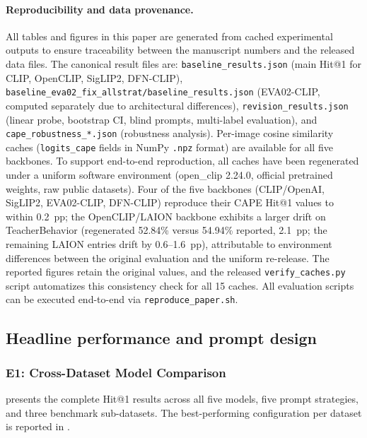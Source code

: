 \documentclass[symmetry,article,submit,pdftex,moreauthors]{Definitions/mdpi}
\begin{document}
\paragraph{Reproducibility and data provenance.}
All tables and figures in this paper are generated from cached experimental outputs to ensure traceability between the manuscript numbers and the released data files. The canonical result files are: \texttt{baseline\_results.json} (main Hit@1 for CLIP, OpenCLIP, SigLIP2, DFN-CLIP), \texttt{baseline\_eva02\_fix\_allstrat/baseline\_results.json} (EVA02-CLIP, computed separately due to architectural differences), \texttt{revision\_results.json} (linear probe, bootstrap CI, blind prompts, multi-label evaluation), and \texttt{cape\_robustness\_*.json} (robustness analysis). Per-image cosine similarity caches (\texttt{logits\_cape} fields in NumPy \texttt{.npz} format) are available for all five backbones. To support end-to-end reproduction, all caches have been regenerated under a uniform software environment (open\_clip 2.24.0, official pretrained weights, raw public datasets). Four of the five backbones (CLIP/OpenAI, SigLIP2, EVA02-CLIP, DFN-CLIP) reproduce their  CAPE Hit@1 values to within 0.2~pp; the OpenCLIP/LAION backbone exhibits a larger drift on TeacherBehavior (regenerated 52.84\% versus 54.94\% reported, 2.1~pp; the remaining LAION entries drift by 0.6--1.6~pp), attributable to environment differences between the original evaluation and the uniform re-release. The reported figures retain the original values, and the released \texttt{verify\_caches.py} script automatizes this consistency check for all 15 caches. All evaluation scripts can be executed end-to-end via \texttt{reproduce\_paper.sh}.

\subsection{Headline performance and prompt design}

\subsubsection{E1: Cross-Dataset Model Comparison}
\label{sec:e1}

 presents the complete Hit@1 results across all five models, five prompt strategies, and three benchmark sub-datasets.
The best-performing configuration per dataset is reported in .
\end{document}
